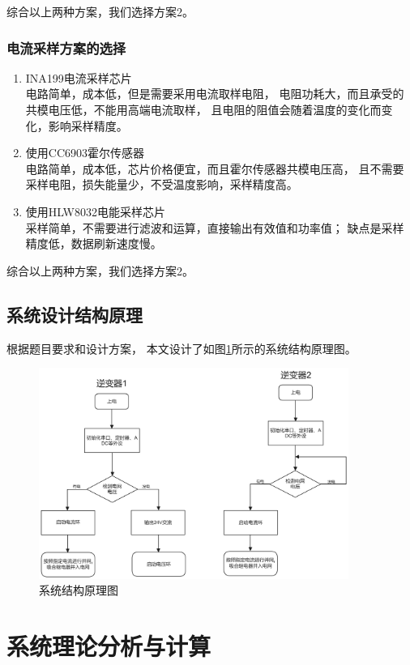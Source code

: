 \documentclass[a4paper,12pt]{article}
\begin{document}
综合以上两种方案，我们选择方案2。

\subsubsection{电流采样方案的选择}
\begin{enumerate}
    \item INA199电流采样芯片 
    \\ 
    电路简单，成本低，但是需要采用电流取样电阻，
    电阻功耗大，而且承受的共模电压低，不能用高端电流取样，
    且电阻的阻值会随着温度的变化而变化，影响采样精度。
    \item 使用CC6903霍尔传感器 
    \\ 
    电路简单，成本低，芯片价格便宜，而且霍尔传感器共模电压高，
    且不需要采样电阻，损失能量少，不受温度影响，采样精度高。
    \item 使用HLW8032电能采样芯片  
    \\
    采样简单，不需要进行滤波和运算，直接输出有效值和功率值；
    缺点是采样精度低，数据刷新速度慢。
\end{enumerate}



综合以上两种方案，我们选择方案2。

\subsection{系统设计结构原理}
根据题目要求和设计方案，
本文设计了如图\ref{fig2}所示的系统结构原理图。
\begin{figure}[htbp]
\centering
\includegraphics[width=0.9\textwidth]{src/fig.png}
\caption{系统结构原理图}
\label{fig2}
\end{figure}


\section{系统理论分析与计算}
\end{document}
